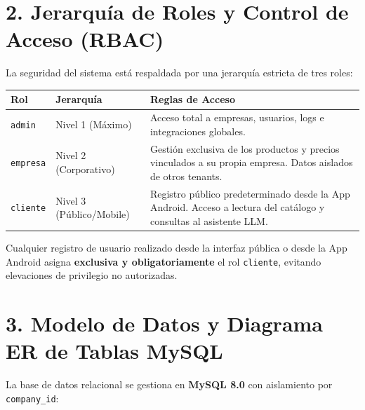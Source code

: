 \documentclass[12pt]{article}
\begin{document}
\newpage
\section{2. Jerarquía de Roles y Control de Acceso (RBAC)}

La seguridad del sistema está respaldada por una jerarquía estricta de tres roles:

\begin{center}
\begin{tabular}{lp{4.5cm}p{7cm}}
\toprule
\textbf{Rol} & \textbf{Jerarquía} & \textbf{Reglas de Acceso} \\
\midrule
\texttt{admin} & Nivel 1 (Máximo) & Acceso total a empresas, usuarios, logs e integraciones globales. \\
\texttt{empresa} & Nivel 2 (Corporativo) & Gestión exclusiva de los productos y precios vinculados a su propia empresa. Datos aislados de otros tenants. \\
\texttt{cliente} & Nivel 3 (Público/Mobile) & Registro público predeterminado desde la App Android. Acceso a lectura del catálogo y consultas al asistente LLM. \\
\bottomrule
\end{tabular}
\end{center}

\begin{alerta}
Cualquier registro de usuario realizado desde la interfaz pública o desde la App Android asigna \textbf{exclusiva y obligatoriamente} el rol \texttt{cliente}, evitando elevaciones de privilegio no autorizadas.
\end{alerta}

\newpage
\section{3. Modelo de Datos y Diagrama ER de Tablas MySQL}

La base de datos relacional se gestiona en \textbf{MySQL 8.0} con aislamiento por \texttt{company\_id}:
\end{document}
